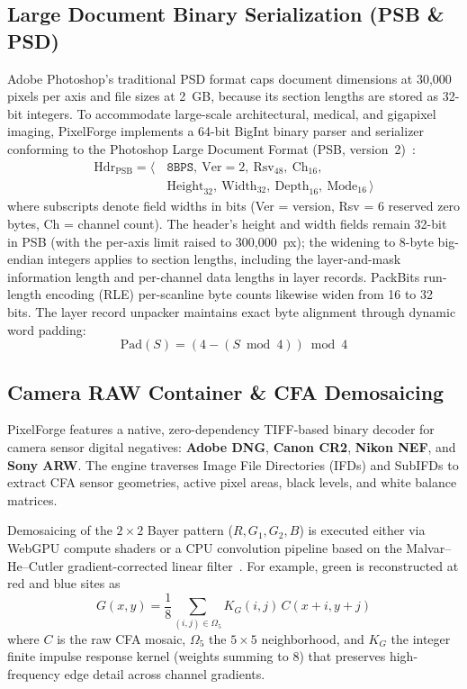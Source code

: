 \documentclass[10pt,journal,compsoc]{IEEEtran}
\begin{document}
\subsection{Large Document Binary Serialization (PSB \& PSD)}
Adobe Photoshop's traditional PSD format caps document dimensions at 30{,}000 pixels per axis and file sizes at 2~GB, because its section lengths are stored as 32-bit integers. To accommodate large-scale architectural, medical, and gigapixel imaging, PixelForge implements a 64-bit BigInt binary parser and serializer conforming to the Photoshop Large Document Format (PSB, version~2)~\cite{adobe2020psd}:
\begin{equation}
\begin{aligned}
\text{Hdr}_{\text{PSB}} = \big\langle\, & \texttt{8BPS},\ \text{Ver}{=}2,\ \text{Rsv}_{48},\ \text{Ch}_{16}, \\
& \text{Height}_{32},\ \text{Width}_{32},\ \text{Depth}_{16},\ \text{Mode}_{16} \,\big\rangle
\end{aligned}
\end{equation}
where subscripts denote field widths in bits (Ver = version, Rsv = 6 reserved zero bytes, Ch = channel count). The header's height and width fields remain 32-bit in PSB (with the per-axis limit raised to 300{,}000~px); the widening to 8-byte big-endian integers applies to section lengths, including the layer-and-mask information length and per-channel data lengths in layer records. PackBits run-length encoding (RLE) per-scanline byte counts likewise widen from 16 to 32 bits. The layer record unpacker maintains exact byte alignment through dynamic word padding:
\begin{equation}
\text{Pad}(S) = (4 - (S \bmod 4)) \bmod 4
\end{equation}

\subsection{Camera RAW Container \& CFA Demosaicing}
PixelForge features a native, zero-dependency TIFF-based binary decoder for camera sensor digital negatives: \textbf{Adobe DNG}, \textbf{Canon CR2}, \textbf{Nikon NEF}, and \textbf{Sony ARW}. The engine traverses Image File Directories (IFDs) and SubIFDs to extract CFA sensor geometries, active pixel areas, black levels, and white balance matrices.

Demosaicing of the $2\times 2$ Bayer pattern ($R, G_1, G_2, B$) is executed either via WebGPU compute shaders or a CPU convolution pipeline based on the Malvar--He--Cutler gradient-corrected linear filter~\cite{malvar2004}. For example, green is reconstructed at red and blue sites as
\begin{equation}
G(x, y) = \frac{1}{8} \sum_{(i,j) \in \Omega_5} K_G(i, j)\, C(x+i, y+j)
\end{equation}
where $C$ is the raw CFA mosaic, $\Omega_5$ the $5\times 5$ neighborhood, and $K_G$ the integer finite impulse response kernel (weights summing to 8) that preserves high-frequency edge detail across channel gradients.
\end{document}
